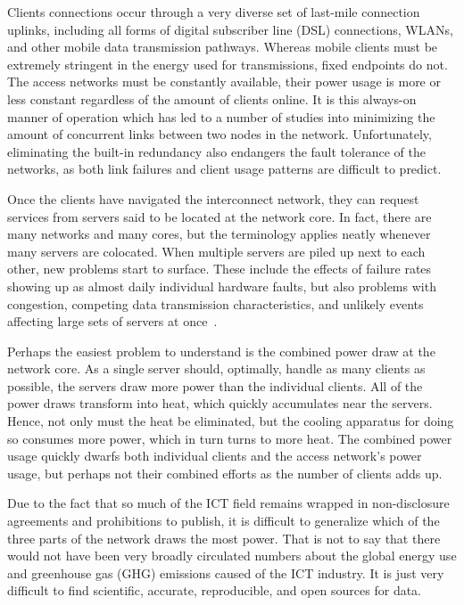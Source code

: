 \documentclass[officiallayout]{tktla}
\begin{document}
Clients connections occur through a very diverse set of last-mile connection
uplinks, including all forms of digital subscriber line (DSL) connections,
WLANs, and other mobile data transmission pathways. Whereas mobile clients
must be extremely stringent in the energy used for transmissions, fixed
endpoints do not. The access networks must be constantly available, their
power usage is more or less constant regardless of the amount of clients
online. It is this always-on manner of operation which has led to a number of
studies into minimizing the amount of concurrent links between two nodes in
the network. Unfortunately, eliminating the built-in redundancy also endangers
the fault tolerance of the networks, as both link failures and client usage
patterns are difficult to predict.

Once the clients have navigated the interconnect network, they can request
services from servers said to be located at the network core. In fact, there
are many networks and many cores, but the terminology applies neatly whenever
many servers are colocated. When multiple servers are piled up next to each
other, new problems start to surface. These include the effects of failure
rates showing up as almost daily individual hardware faults, but also problems
with congestion, competing data transmission characteristics, and unlikely
events affecting large sets of servers at
once~\cite{Barroso2009,Christian2012}.

Perhaps the easiest problem to understand is the combined power draw at the
network core. As a single server should, optimally, handle as many clients as
possible, the servers draw more power than the individual clients. All of the
power draws transform into heat, which quickly accumulates near the servers.
Hence, not only must the heat be eliminated, but the cooling apparatus for
doing so consumes more power, which in turn turns to more heat. The combined
power usage quickly dwarfs both individual clients and the access network's
power usage, but perhaps not their combined efforts as the number of clients
adds up.

Due to the fact that so much of the ICT field remains wrapped in non-disclosure
agreements and prohibitions to publish, it is difficult to generalize which of
the three parts of the network draws the most power. That is not to say that
there would not have been very broadly circulated numbers about the global
energy use and greenhouse gas (GHG) emissions caused of the ICT industry. It
is just very difficult to find scientific, accurate, reproducible, and open
sources for data.
\end{document}
